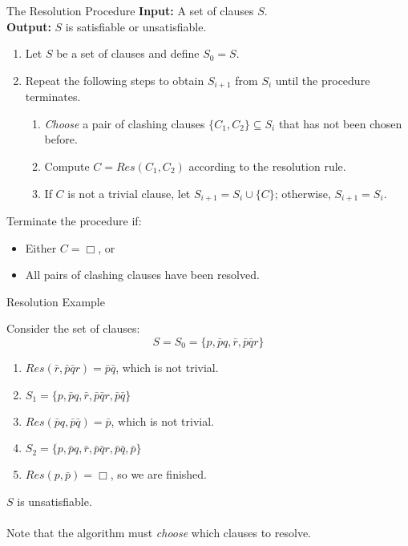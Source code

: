 \begin{wideslide}[bm=,toc=]{The Resolution Procedure}
{ \bf Input:} A set of clauses $S$.\\
{ \bf Output:} $S$ is satisfiable or unsatisfiable.\\
\begin{enumerate}
\item<2-> Let $S$ be a set of clauses and define $S_0 = S$.
\item<3-> Repeat the following steps to obtain $S_{i+1}$ from $S_i$ until
the procedure terminates.
\begin{enumerate}
\item<4-> \emph{Choose} a pair of clashing clauses $\{C_1,C_2\} \subseteq S_i$ that
has not been chosen before.
\item<5->Compute $C = Res(C_1,C_2)$ according to the resolution rule.
\item<6->If $C$ is not a trivial clause, let $S_{i + 1} = S_i \cup \{C\}$;
otherwise, $S_{i+1} = S_i$.
\end{enumerate}
\end{enumerate}
\pause[6]
Terminate the procedure if:
\begin{itemize}
\item Either $C = \Box$, or
\item All pairs of clashing clauses have been resolved. 
\end{itemize}

\end{wideslide}

\begin{wideslide}[bm=,toc=]{Resolution Example}
\begin{ex}{4.19}
Consider the set of clauses:
\[
  S  = S_0 = \{p,\bar{p}q,\bar{r},\bar{p}\bar{q}r\}
  \]
\end{ex}
\begin{enumerate}
\item<2-> $Res(\bar{r},\bar{p}\bar{q}r) = \bar{p}\bar{q}$, which is not trivial.
\item<3-> $S_1  = \{p,\bar{p}q,\bar{r},\bar{p}\bar{q}r, \bar{p}\bar{q}\}$
\item<4-> $Res(\bar{p}q,\bar{p}\bar{q}) = \bar{p}$, which is not trivial.
\item<5-> $S_2  = \{p,\bar{p}q,\bar{r},\bar{p}\bar{q}r, \bar{p}\bar{q}, \bar{p}\}$
\item<6-> $Res(p,\bar{p}) = \Box $, so we are finished.
\end{enumerate}
 $S$ is unsatisfiable.\\
\pause ~\\
Note that the algorithm must \emph{choose} which clauses to resolve.
\end{wideslide}

